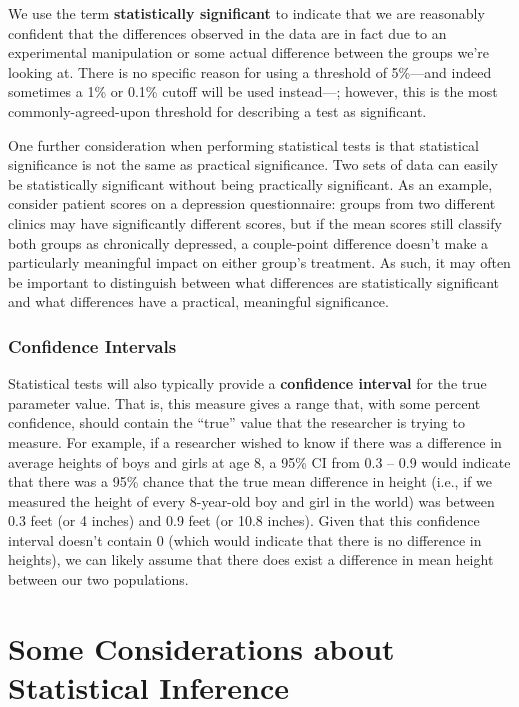 We use the term \textbf{statistically significant} to indicate that we are reasonably confident that the differences observed in the data are in fact due to an experimental manipulation or some actual difference between the groups we're looking at. There is no specific reason for using a threshold of 5\%---and indeed sometimes a 1\% or 0.1\% cutoff will be used instead---; however, this is the most commonly-agreed-upon threshold for describing a test as significant.

One further consideration when performing statistical tests is that statistical significance is not the same as practical significance. Two sets of data can easily be statistically significant without being practically significant. As an example, consider patient scores on a depression questionnaire: groups from two different clinics may have significantly different scores, but if the mean scores still classify both groups as chronically depressed, a couple-point difference doesn't make a particularly meaningful impact on either group's treatment. As such, it may often be important to distinguish between what differences are statistically significant and what differences have a practical, meaningful significance.

\subsubsection{Confidence Intervals}
Statistical tests will also typically provide a \textbf{confidence interval} for the true parameter value. That is, this measure gives a range that, with some percent confidence, should contain the ``true'' value that the researcher is trying to measure. For example, if a researcher wished to know if there was a difference in average heights of boys and girls at age 8, a 95\% CI from 0.3 -- 0.9 would indicate that there was a 95\% chance that the true mean difference in height (i.e., if we measured the height of every 8-year-old boy and girl in the world) was between 0.3 feet (or 4 inches) and 0.9 feet (or 10.8 inches). Given that this confidence interval doesn't contain 0 (which would indicate that there is no difference in heights), we can likely assume that there does exist a difference in mean height between our two populations.

\section{Some Considerations about Statistical Inference}

